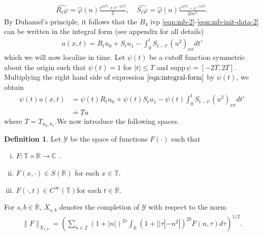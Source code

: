 \documentclass[12pt,reqno]{amsart}
\numberwithin{equation}{section}  %
\numberwithin{figure}{section}
\newcommand{\rr}{\mathbb{R}}
\newcommand{\zz}{\mathbb{Z}}
\newcommand{\cc}{\mathbb{C}}
\newcommand{\ci}{\mathbb{T}}
\newcommand{\wh}{\widehat}
\newcommand{\vp}{\varphi}
\theoremstyle{plain}
\theoremstyle{definition}
\newtheorem{definition}{Definition}
\theoremstyle{remark}
\begin{document}
%
%
\begin{gather}
  \label{sin-cos-op}
  \wh{R_{t}\vp} = \wh{\vp}(n) \frac{e^{in^{2}t} + e^{-in^{2}t}}{2} , \quad 
  \wh{S_{t}\vp} = \wh{\vp}(n) \frac{e^{in^{2}t} - e^{-in^{2}t}}{2i n^{2}}.
\end{gather}
%
%
By Duhamel's principle, it
follows that the $B_4$ ivp \eqref{eqn:mb-2}-\eqref{eqn:mb-init-data-2} can
be written in the integral form (see appendix for all details)
%
%
\begin{equation}
  \begin{split}
    u(x,t) = R_{t}u_{0} + S_{t}u_{1} - \int_{0}^{t} S_{t-t'}
    (u^{2})_{xx} dt'
  \end{split}
  \label{eqn:integral-form}
\end{equation}
%
%
which we will now localize in time.
Let $\psi(t)$ be a cutoff function symmetric about the 
origin such that $\psi(t) = 1$ for $|t| \le T$ and $\text{supp} \, \psi 
= [-2T, 2T ]$. Multiplying the right hand side of expression
$\eqref{eqn:integral-form}$ by $\psi(t)$, we obtain
%
%
\begin{equation}
  \begin{split}
    \psi(t) u(x,t)
    & = \psi(t) R_{t} u_{0} + \psi(t) S_{t}u_{1} -
    \psi(t) \int_{0}^{t} S_{t-t'}
    (u^{2})_{xx} dt'
    \\
    & \doteq Tu
  \end{split}
  \label{localized-int-eqn}
\end{equation}
where $T=T_{u_0, u_1}$.We now introduce the following spaces. 
%
%
\begin{definition}
  Let $\mathcal{Y}$ be the space of functions $F(\cdot)$ such that
  \begin{enumerate}[(i)]
   \item{$F: \ci \times \rr \to \cc$ }.
   \item{ $F(x, \cdot) \in S(\rr)$ for each $x \in \ci$}.
   \item{ $F(\cdot, t) \in C^{\infty}(\ci)$for each $t \in \rr$}.
  \end{enumerate}
  For $s, b \in \rr$, $X_{s,b}$ denotes the completion of $\mathcal{Y}$ with
  respect to the norm
  \begin{equation}
  \begin{split}
    \|F\|_{X_{s,b}} = \left( \sum_{n \in \zz} (1 + |n|)^{2s} \int_{\rr}
    (1 + | | \tau | - n^{2} |)^{2b} \wh{F}(n, \tau) d \tau\right)^{1/2}.
  \end{split}
  \label{eqn:bous-norm}
  \end{equation}
\end{definition}
\end{document}
